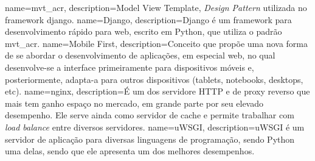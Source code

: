     {
        name=\gls{mvt_acr},
        description={Model View Template, \textit{Design Pattern} utilizada no framework \gls{django}.}
    }
    {
        name=Django,
        description={Django é um framework para desenvolvimento rápido para web, escrito em Python, que utiliza o padrão \gls{mvt_acr}.}
    }
    {
        name={Mobile First},
        description={Conceito que propõe uma nova forma de se abordar o desenvolvimento de aplicações, em especial web, no qual desenvolve-se a interface primeiramente para dispositivos móveis e, posteriormente, adapta-a para outros dispositivos (tablets, notebooks, desktops, etc).}
    }
    {
        name=nginx,
        description={É um dos servidore HTTP e de proxy reverso que mais tem ganho espaço no mercado, em grande parte por seu elevado desempenho. Ele serve ainda como servidor de cache e permite trabalhar com \textit{load balance} entre diversos servidores.}
    }
    {
        name=uWSGI,
        description={uWSGI é um servidor de aplicação para diversas linguagens de programação, sendo Python uma delas, sendo que ele apresenta um dos melhores desempenhos.}
    }

\renewcommand*{\glsseeformat}[3][\seename]{\textit{#1}
\glsseelist{#2}}



